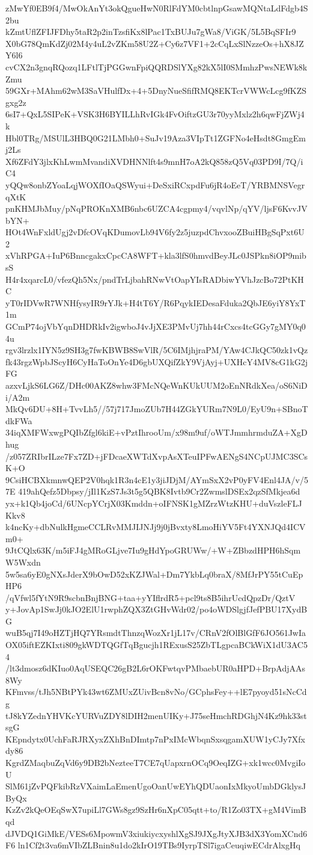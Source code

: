 zMwYf0EB9f4/MwOkAnYt3okQgueHwN0RlFdYM0cbtlnpGsawMQNtaLdFdgb4S2bu
kZmtUflZFIJFDhy5taR2p2inTzsfiKx8lPac1TxBUJu7gWa8/ViGK/5L5BqSFIr9
X0bG78QmKdZj02M4y4uL2vZKm58U2Z+Cy6z7VF1+2cCqLxSlNzzeOs+hX8JZY6l6
cvCX2n3gnqRQozq1LFtlTjPGGwnFpiQQRDSlYXg82kX5lI0SMmhzPwsNEWk8kZmu
59GXr+MAhm62wM3SaVHulfDx+4+5DnyNueSfifRMQ8EKTcrVWWcLcg9fKZSgxg2z
6sI7+QxL5SIPeK+VSK3H6BYILLhRvIGk4FvOiftzGU3r70yyMxlz2h6qwFjZWj4k
Hbl0TRg/MSUlL3HBQ0G21LMbh0+SuJv19Aza3VIpTt1ZGFNo4eHsdt8GmgEmj2Ls
Xf6ZFdY3jlxKhLwmMvandiXVDHNNlft4s9mnH7oA2kQ858zQ5Vq03PD9I/7Q/iC4
yQQw8onbZYoaLqjWOXfIOaQSWyui+DeSxiRCxpdFu6jR4oEeT/YRBMNSVegrqXtK
pnKHMJbMuy/pNqPROKnXMB6nbc6UZCA4cgpmy4/vqvlNp/qYV/ljsF6KvvJVbYN+
HOt4WnFxldUgj2vDfcOVqKDumovLb94V6fy2z5juzpdChvxooZBuiHBgSqPxt6U2
xVhRPGA+IuP6BnncgakxCpcCA8WFT+kla3lfS0hmvdBeyJLc0JSPkn8iOP9mibsS
H4r4xqarcL0/vfezQh5Nx/pndTrLjbahRNwVtOapYIsRADbiwYVhJzcBo72PtKHC
yT0rIDVwR7WNHfysyIR9rYJk+H4tT6Y/R6PqykIEDesaFduka2QbJE6yiY8YxT1m
GCmP74ojVbYqnDHDRkIv2igwboJ4vJjXE3PMvUj7hh44rCxcs4tcGGy7gMY0q04u
rgv3lrzlx1IYN5z9SH3g7fwKBWB8SwVlR/5C6IMjhjraPM/YAw4CJkQC50zk1vQz
fk43rgzWpbJScyH6CyHaToOnYe4D6gbUXQifZkY9VjAyj+UXHcY4MV8cG1kG2jFG
azxvLjkS6LG6Z/DHc00AKZ8whw3FMcNQeWnKUkUUM2oEnNRdkXea/oS6NiDi/A2m
MkQv6DU+8H+TvvLh5//57j717JmoZUb7H44ZGkYURm7N9L0/EyU9n+SBnoTdkFWa
34iqXMFWxwgPQIbZfgl6kiE+vPztIhrooUm/x98m9uf/oWTJmmhrmduZA+XgDhug
/z057ZRIbrILze7Fx7ZD+jFDcaeXWTdXvpAsXTeuIPFwAENgS4NCpUJMC3SCsK+O
9CsiHCBXkmnwQEP2V0hqk1R3n4cE1y3jiJDjM/AYmSxX2vP0yFV4Enl4JA/v/57E
419ahQefz5Dbpsy/jIl1KzS7Js3t5g5QBK8Ivtb9Cr2ZwmslDSEx2qzSfMkjea6d
yx+k1Qb4joCd/6UNcpYCrjX03Kmddn+oIFNSK1gMZrzWtzKHU+duVszleFLJKkv8
k4ncKy+dbNulkHgmeCCLRvMMJIJNJj9j0jBvxty8LmoHiYV5Ft4YXNJQd4ICVm0+
9JtCQlx63K/m5iFJ4gMRoGLjve7Iu9gHdYpoGRUWw/+W+ZBbzdHPH6hSqmW5Wxdn
5w5sa6yE0gNXsJderX9bOwD52xKZJWal+Dm7YkbLq0braX/8MfJrPY55tCuEpHP6
/qVfwl5fYtN9R9scbnBnjBNG+taa+yYIflrdR5+pcl9ts8B5ihrUcdQpzDr/QztV
y+JovAp1SwJj0kJO2ElU1rwphZQX3ZtGHvWdr02/po4oWDSlgjfJefPBU17XydBG
wuB5qj7I49oHZTjHQ7YRsmdtThnzqWozXr1jL17v/CRnV2fOlBlGfF6JO561JwIa
OX05iftEZKIxti809gkWDTQGfTqBgucjh1RExusS25ZbTLgpcaBCkWiX1dU3AC54
/lt3dmosz6dKIuo0AqUSEQC26gB2L6rOKFwtqvPMbaebUR0aHPD+BrpAdjAAs8Wy
KFmvss/tJh5NBtPYk43wt6ZMUxZUivBcn8vNo/GCphsFey++lE7pyoyd51sNcCdg
tJ8kYZednYHVKcYURVuZDY8lDIH2menUIKy+J75seHmchRDGhjN4Kz9hk33stsgG
KEpndytx0UchFaRJRXyxZXhBnDImtp7nPxIMcWbqnSxsqgamXUW1yCJy7Xfxdy86
KgrdZMaqbuZqVd6y9DB2bNezteeT7CE7qUapxrnOCq9OeqIZG+xk1wcc0MvgiIoU
SlM61jZvPQFkibRzVXaimLaEmenUgoOanUwEYhQDUaonIxMkyoUmbDGklysJByQx
KzZv2kQeOEqSwX7upiLl7GWs8gz9SzHr6nXpC05qtt+to/R1Zo03TX+gM4VimBqd
dJVDQ1GiMkE/VESs6MpowmV3xiukiycxyshlXgSJ9JXgJtyXJB3dX3YomXCnd6F6
ln1Cf2t3va6mVIbZLBnin8u1do2kIrO19TBs9IyrpTSl7igaCeuqiwECdrAlxgHq
